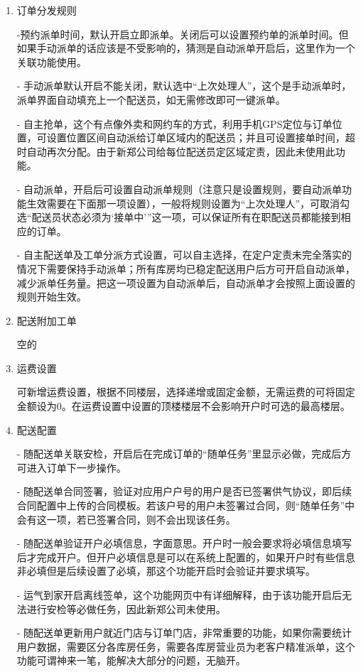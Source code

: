 \documentclass[UTF8]{ctexart}
\begin{document}
\begin{enumerate}
\item 订单分发规则

-预约派单时间，默认开启立即派单。关闭后可以设置预约单的派单时间。但如果手动派单的话应该是不受影响的，猜测是自动派单开启后，这里作为一个关联功能使用。

- 手动派单默认开启不能关闭，默认选中“上次处理人”，这个是手动派单时，派单界面自动填充上一个配送员，如无需修改即可一键派单。

- 自主抢单，这个有点像外卖和网约车的方式，利用手机GPS定位与订单位置，可设置位置区间自动派给订单区域内的配送员；并且可设置接单时间，超时自动再次分配。由于新郑公司给每位配送员定区域定责，因此未使用此功能。

- 自动派单，开启后可设置自动派单规则（注意只是设置规则，要自动派单功能生效需要在下面那一项设置），一般将规则设置为“上次处理人”，可取消勾选“配送员状态必须为‘接单中’”这一项，可以保证所有在职配送员都能接到相应的订单。

- 自主配送单及工单分派方式设置，可以自主选择，在定户定责未完全落实的情况下需要保持手动派单；所有库房均已稳定配送用户后方可开启自动派单，减少派单任务量。把这一项设置为自动派单后，自动派单才会按照上面设置的规则开始生效。

\item 配送附加工单

空的

\item 运费设置

可新增运费设置，根据不同楼层，选择递增或固定金额，无需运费的可将固定金额设为0。在运费设置中设置的顶楼楼层不会影响开户时可选的最高楼层。

\item 配送配置

- 随配送单关联安检，开启后在完成订单的“随单任务”里显示必做，完成后方可进入订单下一步操作。

- 随配送单合同签署，验证对应用户户号的用户是否已签署供气协议，即后续合同配置中上传的合同模板。若该户号的用户未签署过合同，则“随单任务”中会有这一项，若已签署合同，则不会出现该任务。

- 随配送单验证开户必填信息，字面意思。开户时一般会要求将必填信息填写后才完成开户。但开户必填信息是可以在系统上配置的，如果开户时有些信息非必填但是后续设置了必填，那这个功能开启时会验证并要求填写。

- 运气到家开启离线签单，这个功能网页中有详细解释，由于该功能开启后无法进行安检等必做任务，因此新郑公司未使用。

- 随配送单更新用户就近门店与订单门店，非常重要的功能，如果你需要统计用户数据，需要区分各库房任务，需要各库房营业员为老客户精准派单，这个功能可谓神来一笔，能解决大部分的问题，无脑开。

\end{enumerate}
\end{document}
